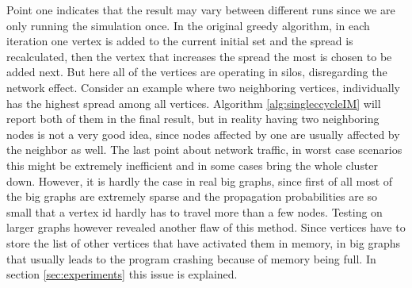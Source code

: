 \documentclass[english]{tktltiki}
\begin{document}
Point one indicates that the result may vary between different runs since we are only running the simulation once. 
In the original greedy algorithm, in each iteration one vertex is added to the current initial set and the spread is recalculated, then the vertex that increases the spread the most is chosen to be added next. 
But here all of the vertices are operating in silos, disregarding the network effect. 
Consider an example where two neighboring vertices, individually has the highest spread among all vertices. 
Algorithm \ref{alg:singleccycleIM} will report both of them in the final result, but in reality having two neighboring nodes is not a very good idea, since nodes affected by one are usually affected by the neighbor as well. 
The last point about network traffic, in worst case scenarios this might be extremely inefficient and in some cases bring the whole cluster down. 
However, it is hardly the case in real big graphs, since first of all most of the big graphs are extremely sparse and the propagation probabilities are so small that a vertex id hardly has to travel more than a few nodes. 
Testing on larger graphs however revealed another flaw of this method. 
Since vertices have to store the list of other vertices that have activated them in memory, in big graphs that usually leads to the program crashing because of memory being full. 
In section \ref{sec:experiments} this issue is explained.
\end{document}
